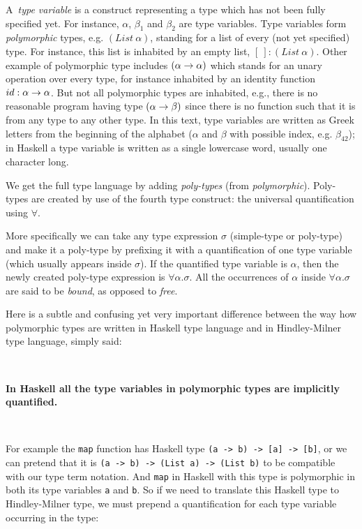 \documentclass[a4paper,oneside]{memoir}
\begin{document}
A~\textit{type variable} is a construct representing a type which has not been fully
specified yet. For instance, $\alpha$, $\beta_1$ and $\beta_2$ are type variables.
Type variables form \textit{polymorphic} types, 
e.g. $(List~\alpha)$, standing for a list of every (not yet specified) type. For instance,
this list is inhabited by an empty list, $[~] : (List~\alpha)$.
Other example of polymorphic type includes $(\alpha \rightarrow \alpha)$ which stands for an unary 
operation over every type, for instance inhabited by
an identity function $id : \alpha \rightarrow \alpha$. 
But not all polymorphic types are inhabited, e.g., there is no reasonable program having 
type $(\alpha \rightarrow \beta)$ since there is no function such that it is from any type to any other 
type. 
In this text, type variables are written as Greek letters from the beginning of the alphabet ($\alpha$ and $\beta$ with possible index, e.g. $\beta_{42}$); 
in Haskell a type variable is written as a single lowercase word, usually one character long.

We get the full type language by adding \textit{poly-types} (from \textit{polymorphic}). Poly-types  are created by use of the fourth type construct: the universal quantification using $\forall$. 

More specifically we can take any type expression $\sigma$ (simple-type or poly-type) and make 
it a poly-type by prefixing it with a quantification of one type variable (which usually appears inside $\sigma$). If the quantified type variable is $\alpha$, then the newly created poly-type expression is $\forall \alpha . \sigma$. All the occurrences of $\alpha$ inside $\forall \alpha . \sigma$ are said to be \textit{bound}, as opposed to \textit{free}.


Here is a subtle and confusing yet very important difference between the way how polymorphic types 
are written in Haskell type language and in Hindley-Milner type language, simply said:

~

\textbf{In Haskell all the type variables in polymorphic types are implicitly quantified.} 

~

For example the \texttt{map} function has Haskell type \texttt{(a -> b) -> [a] -> [b]},
or we can pretend that it is \texttt{(a -> b) -> (List a) -> (List b)} to be compatible with our type term notation.
And \texttt{map} in Haskell with this type is polymorphic in both its type variables \texttt{a}
and \texttt{b}. So if we need to translate this Haskell type to Hindley-Milner type, we must prepend a quantification for each type variable occurring in the type:
\end{document}
